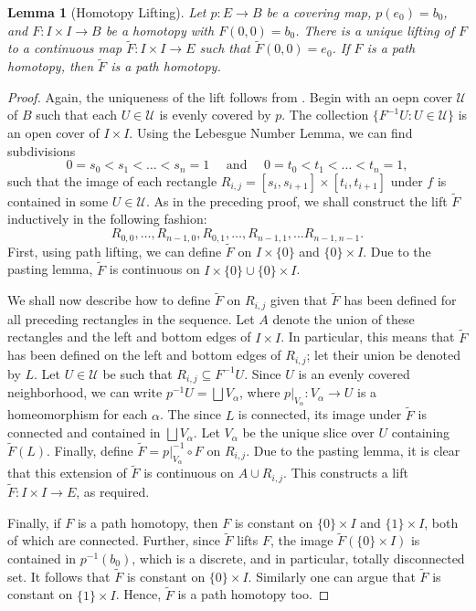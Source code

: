 \documentclass[10pt]{article}
\theoremstyle{thmstyle}
\newtheorem{lemma}[theorem]{Lemma}
\theoremstyle{defstyle}
\newcommand{\wt}[1]{\widetilde{#1}}
\begin{document}
\begin{lemma}[Homotopy Lifting]
    Let $p: E\to B$ be a covering map, $p(e_0) = b_0$, and $F: I\times I\to B$ be a homotopy with $F(0, 0) = b_0$. There is a unique lifting of $F$ to a continuous map $\wt F: I\times I\to E$ such that $\wt F(0, 0) = e_0$. If $F$ is a path homotopy, then $\wt F$ is a path homotopy.
\end{lemma}
\begin{proof}
    Again, the uniqueness of the lift follows from . Begin with an oepn cover $\mathscr U$ of $B$ such that each $U\in\mathscr U$ is evenly covered by $p$. The collection $\{F^{-1}U\colon U\in\mathscr U\}$ is an open cover of $I\times I$. Using the Lebesgue Number Lemma, we can find subdivisions 
    \begin{equation*}
        0 = s_0 < s_1 < \dots < s_n = 1\quad\text{ and }\quad 0 = t_0 < t_1 < \dots < t_n = 1,
    \end{equation*}
    such that the image of each rectangle $R_{i, j} = [s_i, s_{i + 1}]\times[t_i, t_{i + 1}]$ under $f$ is contained in some $U\in\mathscr U$. As in the preceding proof, we shall construct the lift $\wt F$ inductively in the following fashion: 
    \begin{equation*}
        R_{0, 0},\dots, R_{n - 1, 0}, R_{0, 1},\dots, R_{n - 1, 1},\dots R_{n - 1, n - 1}.
    \end{equation*}
    First, using path lifting, we can define $\wt F$ on $I\times\{0\}$ and $\{0\}\times I$. Due to the pasting lemma, $\wt F$ is continuous on $I\times\{0\}\cup\{0\}\times I$. 

    We shall now describe how to define $\wt F$ on $R_{i, j}$ given that $\wt F$ has been defined for all preceding rectangles in the sequence. Let $A$ denote the union of these rectangles and the left and bottom edges of $I\times I$. In particular, this means that $\wt F$ has been defined on the left and bottom edges of $R_{i, j}$; let their union be denoted by $L$. Let $U\in\mathscr U$ be such that $R_{i, j}\subseteq F^{-1}U$. Since $U$ is an evenly covered neighborhood, we can write $p^{-1}U = \bigsqcup V_\alpha$, where $p|_{V_\alpha}: V_\alpha\to U$ is a homeomorphism for each $\alpha$. The since $L$ is connected, its image under $\wt F$ is connected and contained in $\bigsqcup V_\alpha$. Let $V_\alpha$ be the unique slice over $U$ containing $\wt F(L)$. Finally, define $\wt F = p|_{V_\alpha}^{-1}\circ F$ on $R_{i, j}$. Due to the pasting lemma, it is clear that this extension of $\wt F$ is continuous on $A\cup R_{i, j}$. This constructs a lift $\wt F: I\times I\to E$, as required.

    Finally, if $F$ is a path homotopy, then $F$ is constant on $\{0\}\times I$ and $\{1\}\times I$, both of which are connected. Further, since $\wt F$ lifts $F$, the image $\wt F\left(\{0\}\times I\right)$ is contained in $p^{-1}(b_0)$, which is a discrete, and in particular, totally disconnected set. It follows that $\wt F$ is constant on $\{0\}\times I$. Similarly one can argue that $\wt F$ is constant on $\{1\}\times I$. Hence, $\wt F$ is a path homotopy too.
\end{proof}
\end{document}
